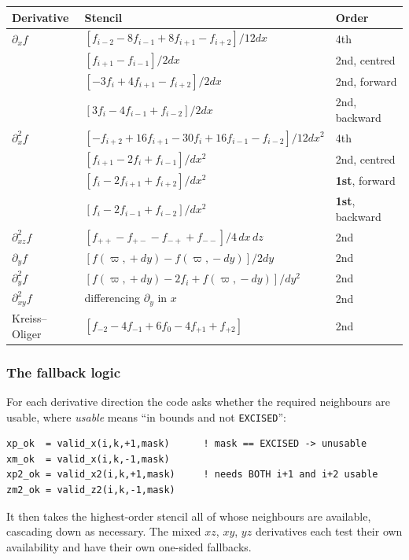 \begin{longtable}{@{}p{2.3cm}p{7.2cm}p{5.4cm}@{}}
\toprule
\textbf{Derivative} & \textbf{Stencil} & \textbf{Order} \\
\midrule
\endhead
$\partial_x f$ & $\left[f_{i-2} - 8f_{i-1} + 8f_{i+1} - f_{i+2}\right]/12dx$ & 4th \\
 & $\left[f_{i+1} - f_{i-1}\right]/2dx$ & 2nd, centred \\
 & $\left[-3f_i + 4f_{i+1} - f_{i+2}\right]/2dx$ & 2nd, forward \\
 & $\left[3f_i - 4f_{i-1} + f_{i-2}\right]/2dx$ & 2nd, backward \\
\addlinespace
$\partial^2_x f$ & $\left[-f_{i+2}+16f_{i+1}-30f_i+16f_{i-1}-f_{i-2}\right]/12dx^2$ & 4th \\
 & $\left[f_{i+1} - 2f_i + f_{i-1}\right]/dx^2$ & 2nd, centred \\
 & $\left[f_i - 2f_{i+1} + f_{i+2}\right]/dx^2$ & \textbf{1st}, forward \\
 & $\left[f_i - 2f_{i-1} + f_{i-2}\right]/dx^2$ & \textbf{1st}, backward \\
\addlinespace
$\partial^2_{xz} f$ & $\left[f_{++} - f_{+-} - f_{-+} + f_{--}\right]/4\,dx\,dz$ & 2nd \\
\addlinespace
$\partial_y f$ & $\left[f(\varpi,\!+dy) - f(\varpi,\!-dy)\right]/2dy$ & 2nd \\
$\partial^2_y f$ & $\left[f(\varpi,\!+dy) - 2f_i + f(\varpi,\!-dy)\right]/dy^2$ & 2nd \\
\addlinespace
$\partial^2_{xy} f$ & differencing $\partial_y$ in $x$ & 2nd \\
\addlinespace
Kreiss--Oliger & $\left[f_{-2}-4f_{-1}+6f_0-4f_{+1}+f_{+2}\right]$ & 2nd \\
\bottomrule
\end{longtable}

\subsubsection{The fallback logic}

For each derivative direction the code asks whether the required neighbours are
usable, where \emph{usable} means ``in bounds and not \texttt{EXCISED}'':
\begin{lstlisting}
xp_ok  = valid_x(i,k,+1,mask)      ! mask == EXCISED -> unusable
xm_ok  = valid_x(i,k,-1,mask)
xp2_ok = valid_x2(i,k,+1,mask)     ! needs BOTH i+1 and i+2 usable
zm2_ok = valid_z2(i,k,-1,mask)
\end{lstlisting}
It then takes the highest-order stencil all of whose neighbours are available,
cascading down as necessary. The mixed $xz$, $xy$, $yz$ derivatives each test
their own availability and have their own one-sided fallbacks.

